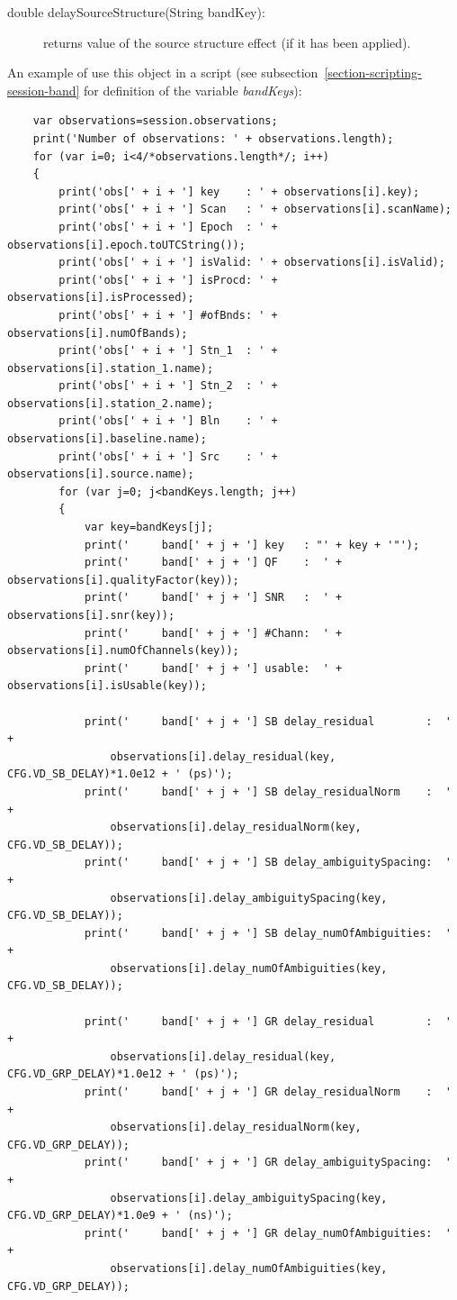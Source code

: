 \documentclass [10pt,letterpaper]{report}
\begin{document}
{{\begin{description}
\item[double delaySourceStructure(String bandKey):]returns
    value of the source structure effect (if it has been applied).
\end{description}
\noindent
An example of use this object in a script (see subsection~\ref{section-scripting-session-band}
for definition of the variable {\sl bandKeys}):
{\small\begin{verbatim}
    var observations=session.observations;
    print('Number of observations: ' + observations.length);
    for (var i=0; i<4/*observations.length*/; i++)
    {
        print('obs[' + i + '] key    : ' + observations[i].key);
        print('obs[' + i + '] Scan   : ' + observations[i].scanName);
        print('obs[' + i + '] Epoch  : ' + observations[i].epoch.toUTCString());
        print('obs[' + i + '] isValid: ' + observations[i].isValid);
        print('obs[' + i + '] isProcd: ' + observations[i].isProcessed);
        print('obs[' + i + '] #ofBnds: ' + observations[i].numOfBands);
        print('obs[' + i + '] Stn_1  : ' + observations[i].station_1.name);
        print('obs[' + i + '] Stn_2  : ' + observations[i].station_2.name);
        print('obs[' + i + '] Bln    : ' + observations[i].baseline.name);
        print('obs[' + i + '] Src    : ' + observations[i].source.name);
        for (var j=0; j<bandKeys.length; j++)
        {
            var key=bandKeys[j];
            print('     band[' + j + '] key   : "' + key + '"');
            print('     band[' + j + '] QF    :  ' + observations[i].qualityFactor(key));
            print('     band[' + j + '] SNR   :  ' + observations[i].snr(key));
            print('     band[' + j + '] #Chann:  ' + observations[i].numOfChannels(key));
            print('     band[' + j + '] usable:  ' + observations[i].isUsable(key));

            print('     band[' + j + '] SB delay_residual        :  ' +
                observations[i].delay_residual(key, CFG.VD_SB_DELAY)*1.0e12 + ' (ps)');
            print('     band[' + j + '] SB delay_residualNorm    :  ' +
                observations[i].delay_residualNorm(key, CFG.VD_SB_DELAY));
            print('     band[' + j + '] SB delay_ambiguitySpacing:  ' +
                observations[i].delay_ambiguitySpacing(key, CFG.VD_SB_DELAY));
            print('     band[' + j + '] SB delay_numOfAmbiguities:  ' +
                observations[i].delay_numOfAmbiguities(key, CFG.VD_SB_DELAY));

            print('     band[' + j + '] GR delay_residual        :  ' +
                observations[i].delay_residual(key, CFG.VD_GRP_DELAY)*1.0e12 + ' (ps)');
            print('     band[' + j + '] GR delay_residualNorm    :  ' +
                observations[i].delay_residualNorm(key, CFG.VD_GRP_DELAY));
            print('     band[' + j + '] GR delay_ambiguitySpacing:  ' +
                observations[i].delay_ambiguitySpacing(key, CFG.VD_GRP_DELAY)*1.0e9 + ' (ns)');
            print('     band[' + j + '] GR delay_numOfAmbiguities:  ' +
                observations[i].delay_numOfAmbiguities(key, CFG.VD_GRP_DELAY));


\end{verbatim}}}}
\end{document}
